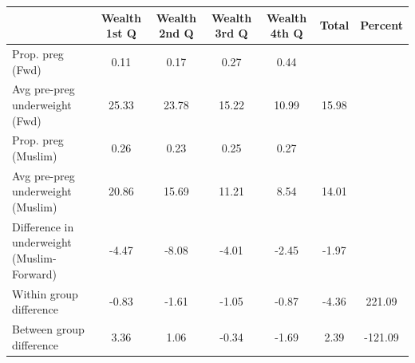 \begin{tabular}{l*{6}{c}}
\toprule
            &\multicolumn{1}{c}{Wealth 1st Q}&\multicolumn{1}{c}{Wealth 2nd Q}&\multicolumn{1}{c}{Wealth 3rd Q}&\multicolumn{1}{c}{Wealth 4th Q}&\multicolumn{1}{c}{Total}&\multicolumn{1}{c}{Percent}\\
\midrule
\midrule
Prop. preg (Fwd)&        0.11&        0.17&        0.27&        0.44&            &            \\
Avg pre-preg underweight (Fwd)&       25.33&       23.78&       15.22&       10.99&       15.98&            \\
Prop. preg (Muslim)&        0.26&        0.23&        0.25&        0.27&            &            \\
Avg pre-preg underweight (Muslim)&       20.86&       15.69&       11.21&        8.54&       14.01&            \\
Difference in underweight (Muslim-Forward)&       -4.47&       -8.08&       -4.01&       -2.45&       -1.97&            \\
Within group difference&       -0.83&       -1.61&       -1.05&       -0.87&       -4.36&      221.09\\
Between group difference&        3.36&        1.06&       -0.34&       -1.69&        2.39&     -121.09\\
\bottomrule
\end{tabular}
